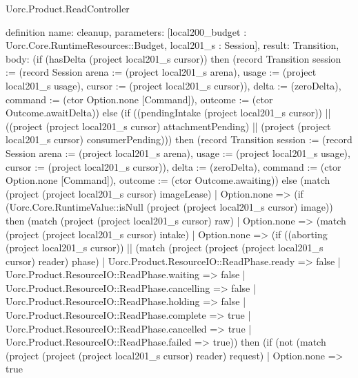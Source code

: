 \begin{lexlean}{Uorc.Product.ReadController}
\begin{semanticmodule}
definition{
  name: cleanup,
  parameters: [local200_budget : Uorc.Core.RuntimeResources::Budget, local201_s : Session],
  result: Transition,
  body: (if (hasDelta (project local201_s cursor)) then (record Transition {session := (record Session {arena := (project local201_s arena), usage := (project local201_s usage), cursor := (project local201_s cursor)}), delta := (zeroDelta), command := (ctor Option.none [Command]), outcome := (ctor Outcome.awaitDelta)}) else (if ((pendingIntake (project local201_s cursor)) || ((project (project local201_s cursor) attachmentPending) || (project (project local201_s cursor) consumerPending))) then (record Transition {session := (record Session {arena := (project local201_s arena), usage := (project local201_s usage), cursor := (project local201_s cursor)}), delta := (zeroDelta), command := (ctor Option.none [Command]), outcome := (ctor Outcome.awaiting)}) else (match (project (project local201_s cursor) imageLease)
    | Option.none => (if (Uorc.Core.RuntimeValue::isNull (project (project local201_s cursor) image)) then (match (project (project local201_s cursor) raw)
      | Option.none => (match (project (project local201_s cursor) intake)
        | Option.none => (if ((aborting (project local201_s cursor)) || (match (project (project (project local201_s cursor) reader) phase)
          | Uorc.Product.ResourceIO::ReadPhase.ready => false
          | Uorc.Product.ResourceIO::ReadPhase.waiting => false
          | Uorc.Product.ResourceIO::ReadPhase.cancelling => false
          | Uorc.Product.ResourceIO::ReadPhase.holding => false
          | Uorc.Product.ResourceIO::ReadPhase.complete => true
          | Uorc.Product.ResourceIO::ReadPhase.cancelled => true
          | Uorc.Product.ResourceIO::ReadPhase.failed => true)) then (if (not (match (project (project (project local201_s cursor) reader) request)
          | Option.none => true
}
\end{semanticmodule}
\end{lexlean}

